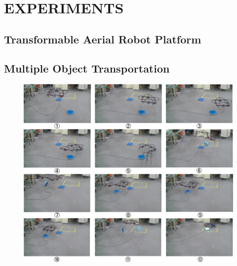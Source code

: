 \section{EXPERIMENTS}
\subsection{Transformable Aerial Robot Platform}
\subsection{Multiple Object Transportation}
\begin{figure}[t]
  \begin{center}
    \includegraphics[width=1.0\columnwidth]{figs/experiment.pdf}
  \end{center}
  \caption{}
  \label{figure:experiment}
\end{figure}

